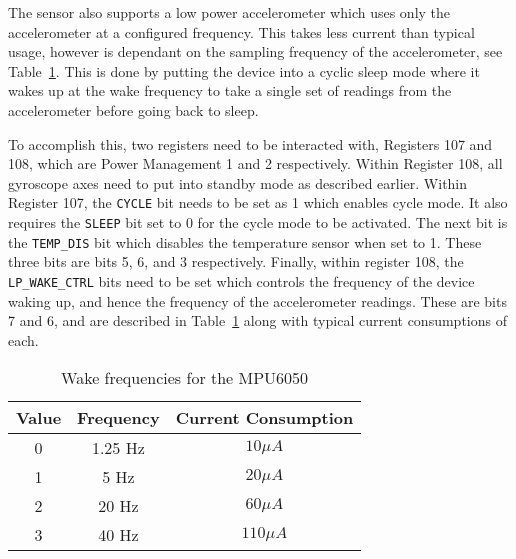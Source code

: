 The sensor also supports a low power accelerometer which uses only the accelerometer at a configured frequency. This takes less current than typical usage, however is dependant on the sampling frequency of the accelerometer, see Table~\ref{tab:sensor:wake}. This is done by putting the device into a cyclic sleep mode where it wakes up at the wake frequency to take a single set of readings from the accelerometer before going back to sleep. 

To accomplish this, two registers need to be interacted with, Registers 107 and 108, which are Power Management 1 and 2 respectively. Within Register 108, all gyroscope axes need to put into standby mode as described earlier. Within Register 107, the \verb|CYCLE| bit needs to be set as 1 which enables cycle mode. It also requires the \verb|SLEEP| bit set to 0 for the cycle mode to be activated. The next bit is the \verb|TEMP_DIS| bit which disables the temperature sensor when set to 1. These three bits are bits 5, 6, and 3 respectively. Finally, within register 108, the \verb|LP_WAKE_CTRL| bits need to be set which controls the frequency of the device waking up, and hence the frequency of the accelerometer readings. These are bits 7 and 6, and are described in Table~\ref{tab:sensor:wake} along with typical current consumptions of each. 

\begin{table}
	\centering
	\begin{tabular}{|c|c|c|}
		\hline
		Value & Frequency & Current Consumption \\
		\hline
		0 & 1.25 Hz & $10\mu A$ \\
		1 & 5 Hz & $20\mu A$ \\
		2 & 20 Hz & $60\mu A$ \\
		3 & 40 Hz & $110\mu A$ \\
		\hline
	\end{tabular}
	\caption{Wake frequencies for the MPU6050}
	\label{tab:sensor:wake}
\end{table}
